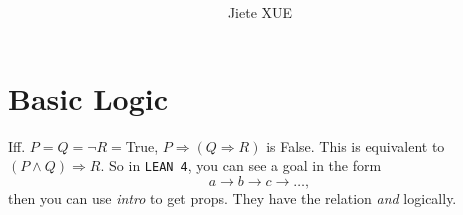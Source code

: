 \documentclass{article}
\title{\textbf{\mytitle}}
\author{Jiete XUE}
\date{\mydate}
\theoremstyle{1}
\begin{document}
\maketitle
\thispagestyle{empty}
\newpage
{}
\setcounter{page}{1}
\tableofcontents
\newpage
{}
\setcounter{page}{1}

\section{Basic Logic}
Iff. $P=Q=\neg R=$True, $P\Rightarrow\left(Q\Rightarrow R\right)$ is False. This is equivalent to $\left(P\wedge Q\right)\Rightarrow R$. So in \texttt{LEAN 4}, you can see a goal in the form
$$a\rightarrow b\rightarrow c\rightarrow\dots,$$
then you can use \textit{intro} to get props. They have the relation \textit{and} logically.
\end{document}
